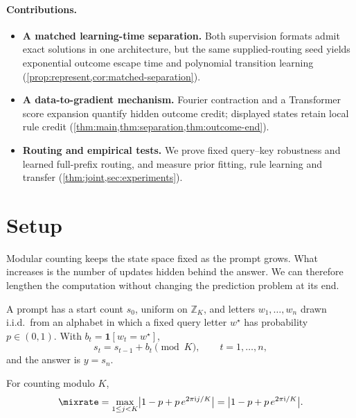 \paragraph{Contributions.}
\begin{itemize}[leftmargin=*,itemsep=3pt,topsep=3pt]
\item \textbf{A matched learning-time separation.} Both supervision formats admit exact
solutions in one architecture, but the same supplied-routing seed yields exponential
outcome escape time and polynomial transition learning (\cref{prop:represent,cor:matched-separation}).
\item \textbf{A data-to-gradient mechanism.} Fourier contraction and a Transformer
score expansion quantify hidden outcome credit; displayed states retain local rule
credit (\cref{thm:main,thm:separation,thm:outcome-end}).
\item \textbf{Routing and empirical tests.} We prove fixed query--key robustness and
learned full-prefix routing, and measure prior fitting, rule learning and transfer
(\cref{thm:joint,sec:experiments}).
\end{itemize}

\section{Setup}
\label{sec:setup}
\label{sec:setting}

Modular counting keeps the state space fixed as the prompt grows. What increases is the number of updates hidden behind the
answer. We can therefore lengthen the computation without changing the prediction problem at its end.

\begin{definition}
\label{def:task}
A prompt has a start count $s_0$, uniform on $\mathbb Z_K$, and letters $w_1,\ldots,w_n$ drawn i.i.d.\ from an alphabet
in which a fixed query letter $w^\star$ has probability $p\in(0,1)$. With $b_t=\mathbf 1[w_t=w^\star]$,
\begin{equation}
 s_t=s_{t-1}+b_t\pmod K,\qquad t=1,\ldots,n,
 \label{eq:tracking}
\end{equation}
and the answer is $y=s_n$.
\end{definition}

\begin{definition}
\label{def:lambda}
For counting modulo $K$,
\begin{equation}
 \mixrate=\max_{1\le j<K}\bigl|1-p+p\,e^{2\pi\mathrm ij/K}\bigr|=\bigl|1-p+p\,e^{2\pi\mathrm i/K}\bigr|.
 \label{eq:lambda}
\end{equation}
\end{definition}

